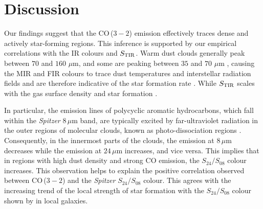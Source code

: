 \documentclass[baaa]{baaa}
\begin{document}
\section{Discussion}
\label{sec:discussion}


Our findings suggest that the CO\,($3-2$) emission effectively traces dense and actively star-forming regions. This inference is supported by our empirical correlations with the IR colours and $S_{\rm TIR}$. Warm dust clouds generally peak between $70$ and $160$ $\mu$m, and some are peaking between $35$ and $70$ $\mu$m \citep{Madden_2012IAUS_284_141M}, causing the MIR and FIR colours to trace dust temperatures and interstellar radiation fields \citep{denBrok_2021_MNRAS_504_3221D} and are therefore indicative of the star formation rate \citep{Gregg_2022ApJ_928_120G}. While $S_{\rm TIR}$ scales with the gas surface density and star formation \citep{denBrok_2021_MNRAS_504_3221D}. 

In particular, the emission lines of polycyclic aromatic hydrocarbons, which fall within the {\it Spitzer} $8\,\mu$m band, are typically excited by far-ultraviolet radiation in the outer regions of molecular clouds, known as photo-dissociation regions \citep[see][]{Madden_2020AA_643A_141M}. Consequently, in the innermost parts of the clouds, the emission at $8\,\mu$m decreases while the emission at $24\,\mu$m increases, and vice versa. This implies that in regions with high dust density and strong CO emission, the $S_{24}/S_{08}$ colour increases. This observation helps to explain the positive correlation observed between CO\,($3-2$) and the {\it Spitzer} $S_{24}/S_{08}$ colour. This agrees with the increasing trend of the local strength of star formation with the $S_{24}/S_{08}$ colour shown by \cite{Gregg_2022ApJ_928_120G} in local galaxies.
\end{document}
